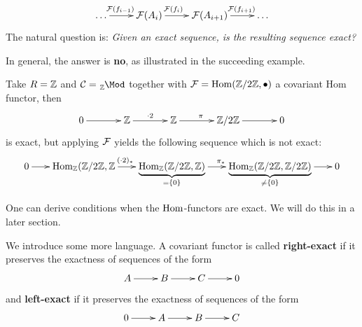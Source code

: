 \documentclass[twoside = false,	%
		headsepline,		%
		parskip = true,
		]{scrbook}						%
\begin{document}
        \begin{equation*}
            \xymatrix {
                \dots \ar^(.4){\cF(f_{i-1})}[r] & \cF(A_i)\ar^(.4){\cF(f_i)}[r] & \cF(A_{i+1})\ar^(.6){\cF(f_{i+1})}[r] & \dots
            }
        \end{equation*}
        The natural question is: \textit{Given an exact sequence, is the resulting sequence exact?}
        
        In general, the answer is \textbf{no}, as illustrated in the succeeding example.

        \begin{example*}{}
            Take $R=\mathbb Z$ and $\cC = \tensor[_\Z]{\Mod}{^{}}$ together with $\mathcal F = \mathrm{Hom}(\mathbb Z/2\mathbb Z,\bullet)$ a covariant Hom functor, then
            \begin{equation*}
                \xymatrix @C=35pt {
                    0 \ar[r] & \Z \ar[r]^{\cdot 2} & \Z \ar[r]^{\pi} & \Z/2 \Z \ar[r] & 0
                }
            \end{equation*}
            is exact, but applying $\mathcal F$ yields the following sequence which is not exact:
            \begin{equation*}
                \xymatrix @C=18pt {
                    0 \ar[r] & \Hom_\Z(\Z/2\Z,\Z \ar[r]^(.47){(\cdot 2)_*} & {\underbrace{\Hom_\Z(\Z/2\Z,\Z)}_{=\{0\}}} \ar[r]^{\pi_*} & {\underbrace{\Hom_\Z(\Z/2 \Z,\Z/2\Z)}_{ \neq\{0\}}} \ar[r] & 0
                }
            \end{equation*}
        \end{example*}
        One can derive conditions when the $\mathrm{Hom}$-functors are exact. We will do this in a later section.

        We introduce some more language. A covariant functor is called \textbf{right-exact} if it preserves the exactness of sequences of the form
        \begin{equation*}
            \xymatrix {
                A \ar[r] & B \ar[r] & C \ar[r] & 0
            }
        \end{equation*}
        and \textbf{left-exact} if it preserves the exactness of sequences of the form
        \begin{equation*}
            \xymatrix {
                 0 \ar[r] & A \ar[r] & B \ar[r] & C
            }
        \end{equation*}
        
\end{document}
